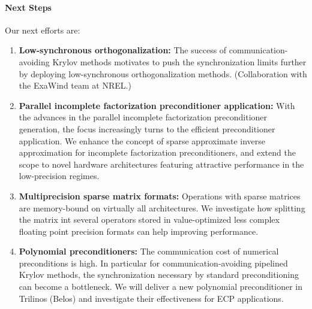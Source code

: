 \paragraph{Next Steps}


Our next efforts are:
\begin{enumerate}
	\item \textbf{Low-synchronous orthogonalization:} The success of 
	communication-avoiding Krylov methods motivates to push the synchronization 
	limits further by deploying low-synchronous orthogonalization methods.
        (Collaboration with the ExaWind team at NREL.)
	\item \textbf{Parallel incomplete factorization preconditioner 
	application:} With the advances in the parallel incomplete factorization
	preconditioner generation, the focus increasingly turns to the efficient 
	preconditioner application. We enhance the concept of sparse approximate 
	inverse approximation for incomplete factorization preconditioners, and 
	extend the scope to novel hardware architectures featuring attractive 
	performance in the low-precision regimes.
	\item \textbf{Multiprecision sparse matrix formats:} Operations with sparse 
	matrices are memory-bound on virtually all architectures. We investigate 
	how splitting the matrix int several operators stored in value-optimized 
	less complex floating point precision formats can help improving
	performance.
	\item \textbf{Polynomial preconditioners:} The communication cost of 
	numerical preconditions is high. In particular for communication-avoiding 
	pipelined Krylov methods, the synchronization necessary by standard 
	preconditioning can become a bottleneck. We will deliver a new
        polynomial preconditioner in Trilinos (Belos) and investigate their effectiveness 
	for ECP applications.
\end{enumerate}
